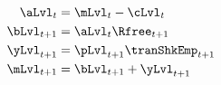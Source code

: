   \begin{equation}\begin{gathered}\begin{aligned}
        \aLvl_{t}  & = \mLvl_{t}-\cLvl_{t} \label{DBCLevel}%
        \\  \bLvl_{t+1}  & = \aLvl_{t} \Rfree_{t+1}
        \\  \yLvl_{t+1}  & = \pLvl_{t+1}\tranShkEmp_{t+1}
        \\  \mLvl_{t+1}  & = \bLvl_{t+1} + \yLvl_{t+1} %
      \end{aligned}\end{gathered}\end{equation}
